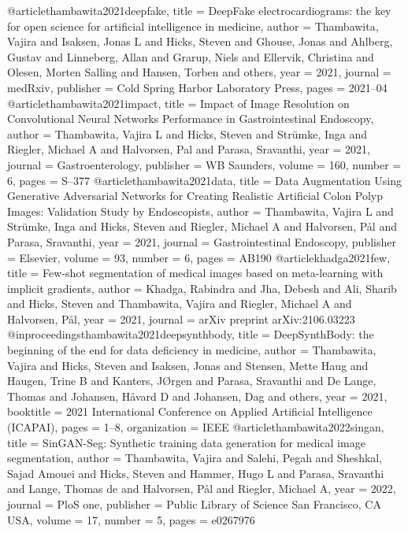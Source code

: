 @article{thambawita2021deepfake,
	title = {DeepFake electrocardiograms: the key for open science for artificial intelligence in medicine},
	author = {Thambawita, Vajira and Isaksen, Jonas L and Hicks, Steven and Ghouse, Jonas and Ahlberg, Gustav and Linneberg, Allan and Grarup, Niels and Ellervik, Christina and Olesen, Morten Salling and Hansen, Torben and others},
	year = 2021,
	journal = {medRxiv},
	publisher = {Cold Spring Harbor Laboratory Press},
	pages = {2021--04}
}
@article{thambawita2021impact,
	title = {Impact of Image Resolution on Convolutional Neural Networks Performance in Gastrointestinal Endoscopy},
	author = {Thambawita, Vajira L and Hicks, Steven and Str{\"u}mke, Inga and Riegler, Michael A and Halvorsen, Pal and Parasa, Sravanthi},
	year = 2021,
	journal = {Gastroenterology},
	publisher = {WB Saunders},
	volume = 160,
	number = 6,
	pages = {S--377}
}
@article{thambawita2021data,
	title = {Data Augmentation Using Generative Adversarial Networks for Creating Realistic Artificial Colon Polyp Images: Validation Study by Endoscopists},
	author = {Thambawita, Vajira L and Str{\"u}mke, Inga and Hicks, Steven and Riegler, Michael A and Halvorsen, P{\aa}l and Parasa, Sravanthi},
	year = 2021,
	journal = {Gastrointestinal Endoscopy},
	publisher = {Elsevier},
	volume = 93,
	number = 6,
	pages = {AB190}
}
@article{khadga2021few,
	title = {Few-shot segmentation of medical images based on meta-learning with implicit gradients},
	author = {Khadga, Rabindra and Jha, Debesh and Ali, Sharib and Hicks, Steven and Thambawita, Vajira and Riegler, Michael A and Halvorsen, P{\aa}l},
	year = 2021,
	journal = {arXiv preprint arXiv:2106.03223}
}
@inproceedings{thambawita2021deepsynthbody,
	title = {DeepSynthBody: the beginning of the end for data deficiency in medicine},
	author = {Thambawita, Vajira and Hicks, Steven and Isaksen, Jonas and Stensen, Mette Haug and Haugen, Trine B and Kanters, J{\O}rgen and Parasa, Sravanthi and De Lange, Thomas and Johansen, H{\aa}vard D and Johansen, Dag and others},
	year = 2021,
	booktitle = {2021 International Conference on Applied Artificial Intelligence (ICAPAI)},
	pages = {1--8},
	organization = {IEEE}
}
@article{thambawita2022singan,
	title = {SinGAN-Seg: Synthetic training data generation for medical image segmentation},
	author = {Thambawita, Vajira and Salehi, Pegah and Sheshkal, Sajad Amouei and Hicks, Steven and Hammer, Hugo L and Parasa, Sravanthi and Lange, Thomas de and Halvorsen, P{\aa}l and Riegler, Michael A},
	year = 2022,
	journal = {PloS one},
	publisher = {Public Library of Science San Francisco, CA USA},
	volume = 17,
	number = 5,
	pages = {e0267976}
}
